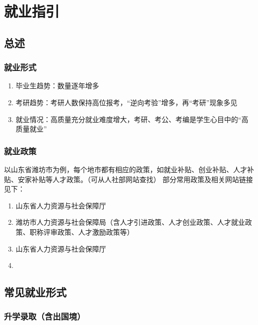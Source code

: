 \chapter[就业指引]{就业指引\footnotemark}

\section[总述]{总述}
\subsection[就业形式]{就业形式}
\begin{enumerate}
    \item 毕业生趋势：数量逐年增多
    \item 考研趋势：考研人数保持高位报考，“逆向考验”增多，再“考研”现象多见
    \item 就业情况：高质量充分就业难度增大，考研、考公、考编是学生心目中的“高质量就业”
\end{enumerate}

\subsection[就业政策]{就业政策}
以山东省潍坊市为例，每个地市都有相应的政策，如就业补贴、创业补贴、人才补贴、安家补贴等人才政策。（可从人社部网站查找）
\bigbreak
部分常用政策及相关网站链接见下：
\begin{enumerate}
    \item 山东省人力资源与社会保障厅
    \item 潍坊市人力资源与社会保障局（含人才引进政策、人才创业政策、人才就业政策、职称评审政策、人才激励政策等）
    \item 山东省人力资源与社会保障厅
    \item {}
\end{enumerate}

\section[常见就业形式]{常见就业形式}
\subsection[升学录取（含出国境）]{升学录取（含出国境）}
